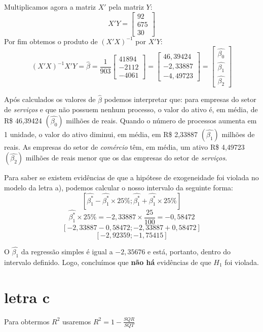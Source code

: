 Multiplicamos agora a matriz \(X'\) pela matriz \(Y\):
\[
	X'Y =
	\begin{bmatrix}
		92  \\
		675 \\
		30
	\end{bmatrix}
\]
Por fim obtemos o produto de \((X'X)^{-1}\) por \(X'Y\):
\[
	(X'X)^{-1}X'Y = \hat{\beta} = \frac{1}{903}
	\begin{bmatrix}
		41894 \\
		-2112 \\
		-4061
	\end{bmatrix}
	=
	\begin{bmatrix}
		46,39424 \\
		-2,33887 \\
		-4,49723
	\end{bmatrix} =
	\begin{bmatrix}
		\hat{\beta_{0}} \\
		\hat{\beta_{1}} \\
		\hat{\beta_{2}}
	\end{bmatrix}
\]

Após calculados os valores de \(\hat{\beta}\) podemos interpretar que: para empresas do setor de \textit{serviços} e que não possuem nenhum processo, o valor do ativo é, em média, de R\$ 46,39424 \((\hat{\beta_{0}})\) milhões de reais. Quando o número de processos aumenta em 1 unidade, o valor do ativo diminui, em média, em R\$ 2,33887 \((\hat{\beta_{1}})\) milhões de reais. As empresas do setor de \textit{comércio} têm, em média, um ativo R\$ 4,49723 \((\hat{\beta_{2}})\) milhões de reais menor que os das empresas do setor de \textit{serviços}.

Para saber se existem evidências de que a hipótese de exogeneidade foi violada no modelo da letra a), podemos calcular o nosso intervalo da seguinte forma:
\[ [\hat{\beta^{*}_{1}}-\hat{\beta^{*}_{1}} \times 25\%;\hat{\beta^{*}_{1}}+\hat{\beta^{*}_{1}} \times 25\%]\]
\[\hat{\beta^{*}_{1}} \times 25\% = -2,33887 \times \frac{25}{100} = -0,58472\]
\[[-2,33887 - 0,58472;-2,33887 + 0,58472]\]
\[[-2,92359;-1,75415]\]

O \(\hat{\beta_{1}}\) da regressão simples é igual a \(-2,35676\) e está, portanto, dentro do intervalo definido. Logo, concluímos que \textbf{não há} evidências de que \(H_{1}\) foi violada.

\section*{letra c}
Para obtermos \(R^{2}\) usaremos \(R^{2} = 1 - \frac{SQR}{SQT}\)

